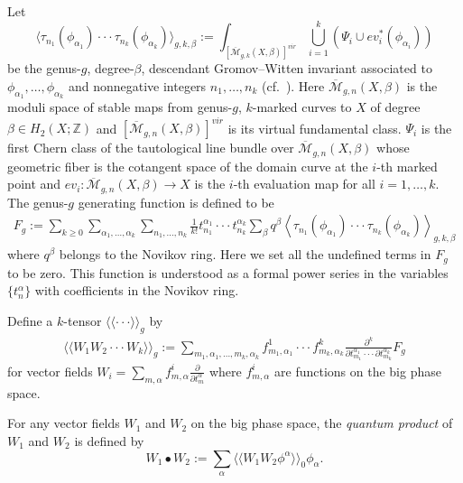 \documentclass[12pt,reqno]{amsart}
\theoremstyle{plain}
\theoremstyle{definition}
\theoremstyle{remark}
\begin{document}
Let
\[\langle\tau_{n_{1}}(\phi_{\alpha_{1}})\cdot\cdot\cdot \tau_{n_{k}}(\phi_{\alpha_{k}})\rangle_{g,k,\beta}
:=\int_{[\overline{\mathcal{M}}_{g,k}(X,\beta)]^{vir}}\bigcup_{i=1}^{k}(\Psi_{i}\cup ev_{i}^{*}(\phi_{\alpha_{i}})) \]
be the genus-$g$, degree-$\beta$, descendant Gromov--Witten invariant associated to $\phi_{\alpha_{1}},\dots,\phi_{\alpha_{k}}$ and nonnegative integers $n_{1},\dots,n_{k}$ (cf.\  \cite{li1998virtual}). Here $\overline{\mathcal{M}}_{g,n}(X,\beta)$ is the moduli space of stable maps from genus-$g$, $k$-marked curves to $X$ of degree $\beta\in H_{2}(X;\mathbb{Z})$  and $[\overline{\mathcal{M}}_{g,n}(X,\beta)]^{vir}$ is its virtual fundamental class.
$\Psi_{i}$ is the first Chern class of the tautological line bundle over $\overline{\mathcal{M}}_{g,n}(X,\beta)$ whose geometric fiber is the cotangent space of the domain curve at the $i$-th marked point and  $ev_{i}\colon \overline{\mathcal{M}}_{g,n}(X,\beta)\rightarrow X$ is the $i$-th evaluation map for all $i=1,\dots,k$.
The genus-$g$ generating function is defined to be
\begin{align*}
F_{g}:=\sum_{k\geq0}\sum_{\alpha_{1},\dots,\alpha_{k}}
\sum_{n_{1},\dots,n_{k}}
\frac{1}{k!}t_{n_{1}}^{\alpha_{1}}\cdot\cdot\cdot t_{n_{k}}^{\alpha_{k}}\sum_{\beta}q^{\beta}
\left<\tau_{n_{1}}(\phi_{\alpha_{1}})\cdot\cdot\cdot \tau_{n_{k}}(\phi_{\alpha_{k}})\right>_{g,k,\beta}
\end{align*}
where $q^{\beta}$ belongs to the Novikov ring. Here we set all the undefined terms in $F_g$ to be zero.
This function is understood as a formal power series in the variables $\{t_{n}^{\alpha}\}$ with coefficients in the Novikov ring.

Define a $k$-tensor $\langle\langle\cdot\cdot\cdot\rangle\rangle_g$ by
\begin{align*}
\langle\langle{W_{1}W_{2}\cdot\cdot\cdot W_{k}}\rangle\rangle_g
:=\sum_{m_{1},\alpha_{1},\dots,m_{k},\alpha_{k}}f_{m_{1},\alpha_{1}}^{1}
\cdot\cdot\cdot f_{m_{k},\alpha_{k}}^{k}\frac{\partial^{k}}{\partial t_{m_{1}}^{\alpha_{1}}\cdot\cdot\cdot \partial t_{m_{k}}^{\alpha_{k}}}F_{g}
\end{align*}
for vector fields $W_{i}=\sum_{m,\alpha}f_{m,\alpha}^{i}\frac{\partial}{\partial t_{m}^{\alpha}}$ where $f_{m,\alpha}^{i}$ are functions on the big phase space. 

For any vector fields $W_{1}$ and $W_{2}$ on the big phase space, the {\it quantum product} of $W_{1}$ and $W_{2}$ is defined by
$$W_{1}\bullet W_{2}:=\sum_{\alpha}\langle\langle{W_{1}W_{2}
\phi^{\alpha}}\rangle\rangle_0\phi_{\alpha}.$$
\end{document}
